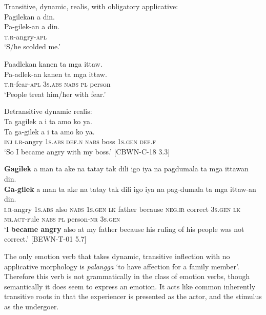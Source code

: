 \ea
Transitive, dynamic, realis, with obligatory applicative: \\
\label{ex:scoldedme}
Pagilekan a din. \\\smallskip
\gll Pa-gilek-an a din. \\
\textsc{t.r}-angry-\textsc{apl} \\
\glt ‘S/he scolded me.’
\z

\ea
\label{ex:withfear}
Paadlekan kanen ta mga ittaw. \\\smallskip
\gll Pa-adlek-an kanen ta mga ittaw. \\
\textsc{t.r}-fear-\textsc{apl} 3\textsc{s.abs} \textsc{nabs} \textsc{pl} person \\
\glt ‘People treat him/her with fear.’
\z

\ea
\label{ex:myboss}
Detransitive dynamic realis: \\
Ta gagilek a i ta amo ko ya. \\\smallskip
\gll Ta ga-gilek a i ta amo ko ya. \\
\textsc{inj} \textsc{i.r}-angry 1\textsc{s.abs} \textsc{def.n} \textsc{nabs} boss 1\textsc{s.gen} \textsc{def.f} \\
\glt ‘So I became angry with my boss.’ [CBWN-C-18 3.3] 
\z

\newpage
\ea
\label{ex:notcorrect}
\textbf{Gagilek}  a  man  ta  ake  na  tatay  tak  dili  igo  iya na  pagdumala  ta  mga  ittawan  din. \\\smallskip
\gll \textbf{Ga-gilek}  a  man  ta  ake  na  tatay  tak  dili  igo  iya na  pag-dumala  ta  mga  ittaw-an  din. \\
\textsc{i.r}-angry  1\textsc{s.abs}  also  \textsc{nabs}  1\textsc{s.gen}  \textsc{lk}  father  because  \textsc{neg.ir}  correct  3\textsc{s.gen} \textsc{lk}  \textsc{nr.act}-rule  \textsc{nabs}  \textsc{pl}  person-\textsc{nr}  3\textsc{s.gen} \\
\glt `I \textbf{became angry} also at my father because his ruling of his people was not correct.’ [BEWN-T-01 5.7]
\z

The only emotion verb that takes dynamic, transitive inflection with no applicative morphology is \textit{palangga} ‘to have affection for a family member’. Therefore this verb is not grammatically in the class of emotion verbs, though semantically it does seem to express an emotion. It acts like common inherently transitive roots in that the experiencer is presented as the actor, and the stimulus as the undergoer.

